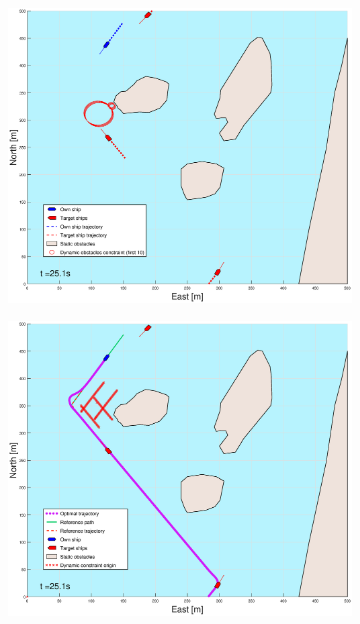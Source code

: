 \begin{figure}[!b]
\begin{subfigure}[b]{0.499\textwidth}
    \end{subfigure}
    \hfill
    \\
    \begin{subfigure}[b]{0.49\textwidth}
        \centering
        \includegraphics[width=\textwidth]{Images/Figures/Helloya_Rev/_Simple_0fig1_time=25}
    \end{subfigure}
    \hfill
    \begin{subfigure}[b]{0.499\textwidth}
        \centering
        \includegraphics[width=\textwidth]{Images/Figures/Helloya_Rev/_Simple_0fig999_time=25}

\end{subfigure}
\end{figure}
